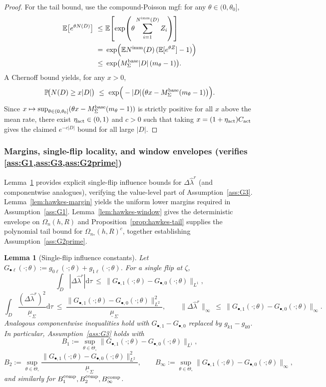 \documentclass{statsoc}
\newtheorem{lemma}[lemma]{Lemma}
\newcommand{\bbE}{\mathbb{E}}
\newcommand{\bbP}{\mathbb{P}}
\newcommand{\dd}{\mathrm{d}}
\newcommand{\1}{\mathbbm{1}}
\begin{document}
\begin{proof}
For the tail bound, use the compound-Poisson mgf: for any $\theta\in(0,\theta_0]$,
\begin{align*}
\bbE\big[e^{\theta N(D)}\big]
\ \le&\ \bbE\!\left[\exp\!\left(\theta\sum_{i=1}^{N^{\rm imm}(D)} Z_i\right)\right]\\
\ =&\ \exp\!\Big(\bbE N^{\rm imm}(D)\,( \bbE[e^{\theta Z}]-1)\Big)\\
\ \le&\ \exp\!\big(M_\Sigma^{\rm base}|D|\,(m_\theta-1)\big).
\end{align*}
A Chernoff bound yields, for any $x>0$,
\[
\bbP\!\big(N(D)\ge x|D|\big)
\ \le\ \exp\!\Big(-|D|\big(\theta x - M_\Sigma^{\rm base}(m_\theta-1)\big)\Big).
\]
Since $x\mapsto \sup_{\theta\in(0,\theta_0]}(\theta x - M_\Sigma^{\rm base}(m_\theta-1))$ is strictly positive for
all $x$ above the mean rate, there exist $\eta_{\rm act}\in(0,1)$ and $c>0$ such that taking
$x=(1+\eta_{\rm act})C_{\rm act}$ gives the claimed $e^{-c|D|}$ bound for all large $|D|$.
\end{proof}

\subsubsection{Margins, single-flip locality, and window envelopes (verifies \cref{ass:G1,ass:G3,ass:G2prime})}
\label{app:hawkes-B}

Lemma~\ref{lem:B-constants} provides explicit single-flip influence bounds for  $\Delta\widehat\lambda^r$ (and componentwise analogues), verifying the value-level part of Assumption~\ref{ass:G3}. Lemma~\ref{lem:hawkes-margin} yields the uniform lower margins required in Assumption~\ref{ass:G1}. Lemma~\ref{lem:hawkes-window} gives the deterministic envelope on $\Omega_n(h,R)$ and Proposition~\ref{prop:hawkes-tail} supplies the polynomial tail bound for $\Omega_{n_*}(h,R)^c$, together establishing Assumption~\ref{ass:G2prime}.

\begin{lemma}[Single-flip influence constants]\label{lem:B-constants}
Let \(G_{\bullet\ell}(\cdot;\theta):=g_{0\ell}(\cdot;\theta)+g_{1\ell}(\cdot;\theta)\). For a single flip at \(\zeta\),
\[
\int_D |\Delta\widehat\lambda^r| \dd\tau\ \le\ \|G_{\bullet,1}(\cdot;\theta)-G_{\bullet,0}(\cdot;\theta)\|_{L^1},
\]
\[
\int_D \frac{(\Delta\widehat\lambda^r)^2}{\underline\mu_\Sigma} \dd\tau\ \le\ \frac{\|G_{\bullet,1}(\cdot;\theta)-G_{\bullet,0}(\cdot;\theta)\|_{L^2}^2}{\underline\mu_\Sigma},
\qquad
\|\Delta\widehat\lambda^r\|_\infty\ \le\ \|G_{\bullet,1}(\cdot;\theta)-G_{\bullet,0}(\cdot;\theta)\|_\infty.
\]
Analogous componentwise inequalities hold with \(G_{\bullet,1}-G_{\bullet,0}\) replaced by \(g_{k1}-g_{k0}\). In particular, Assumption~\ref{ass:G3} holds with
\[
B_1:=\sup_{\theta\in\Theta_\circ}\|G_{\bullet,1}(\cdot;\theta)-G_{\bullet,0}(\cdot;\theta)\|_{L^1},
\]
\[
B_2:=\sup_{\theta\in\Theta_\circ}\frac{\|G_{\bullet,1}(\cdot;\theta)-G_{\bullet,0}(\cdot;\theta)\|_{L^2}^2}{\underline\mu_\Sigma},
\qquad
B_\infty:=\sup_{\theta\in\Theta_\circ}\|G_{\bullet,1}(\cdot;\theta)-G_{\bullet,0}(\cdot;\theta)\|_\infty,
\]
and similarly for \(B_1^{\rm comp},B_2^{\rm comp},B_\infty^{\rm comp}\).
\end{lemma}
\end{document}
